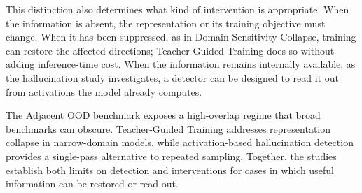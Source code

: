 This distinction also determines what kind of intervention is appropriate. When
the information is absent, the representation or its training objective must
change. When it has been suppressed, as in Domain-Sensitivity Collapse, training
can restore the affected directions; Teacher-Guided Training does so without
adding inference-time cost. When the information remains internally available,
as the hallucination study investigates, a detector can be designed to read it
out from activations the model already computes.

The Adjacent OOD benchmark exposes a high-overlap regime that broad benchmarks
can obscure. Teacher-Guided Training addresses representation collapse in
narrow-domain models, while activation-based hallucination detection provides a
single-pass alternative to repeated sampling. Together, the studies establish
both limits on detection and interventions for cases in which useful information
can be restored or read out.
